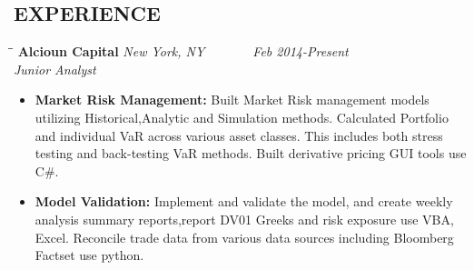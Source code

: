 \documentclass{res}
\begin{document}
\begin{resume}
\section{EXPERIENCE}
  \vspace{-13pt}	
  \begin{tabbing}
   \hspace{2.3in}\= \hspace{2.3in}\= \kill %
    {\bf Alcioun Capital} \> \it{New York, NY} \> ~~~~~~ Feb 2014-Present\\
    \it Junior Analyst\\
   \end{tabbing}\vspace{-20pt}
\begin{itemize}
\item {\bf Market Risk Management:} Built Market Risk management models utilizing Historical,Analytic and Simulation methods.  Calculated Portfolio and individual VaR across various asset classes.  This includes both stress testing and back-testing VaR methods. Built derivative pricing GUI tools use C\#.
\item {\bf Model Validation:} Implement and validate the model, and create weekly analysis summary reports,report DV01 Greeks and risk exposure use VBA, Excel. Reconcile trade data from various data sources including Bloomberg Factset use python.


\end{itemize}
\end{resume}
\end{document}
